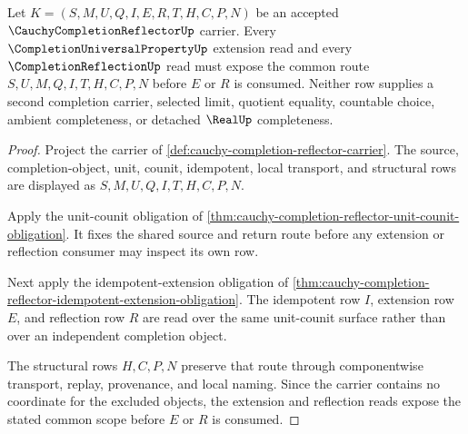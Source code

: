 \begin{theorem}
\label{thm:cauchy-completion-reflector-extension-reflection-scope}
Let $K=(S,M,U,Q,I,E,R,T,H,C,P,N)$ be an accepted $\CauchyCompletionReflectorUp$ carrier. Every $\CompletionUniversalPropertyUp$ extension read and every $\CompletionReflectionUp$ read must expose the common route $S,U,M,Q,I,T,H,C,P,N$ before $E$ or $R$ is consumed. Neither row supplies a second completion carrier, selected limit, quotient equality, countable choice, ambient completeness, or detached $\RealUp$ completeness.
\end{theorem}
\begin{proof}
Project the carrier of \autoref{def:cauchy-completion-reflector-carrier}. The source, completion-object, unit, counit, idempotent, local transport, and structural rows are displayed as $S,M,U,Q,I,T,H,C,P,N$.

Apply the unit-counit obligation of \autoref{thm:cauchy-completion-reflector-unit-counit-obligation}. It fixes the shared source and return route before any extension or reflection consumer may inspect its own row.

Next apply the idempotent-extension obligation of \autoref{thm:cauchy-completion-reflector-idempotent-extension-obligation}. The idempotent row $I$, extension row $E$, and reflection row $R$ are read over the same unit-counit surface rather than over an independent completion object.

The structural rows $H,C,P,N$ preserve that route through componentwise transport, replay, provenance, and local naming. Since the carrier contains no coordinate for the excluded objects, the extension and reflection reads expose the stated common scope before $E$ or $R$ is consumed.
\end{proof}


